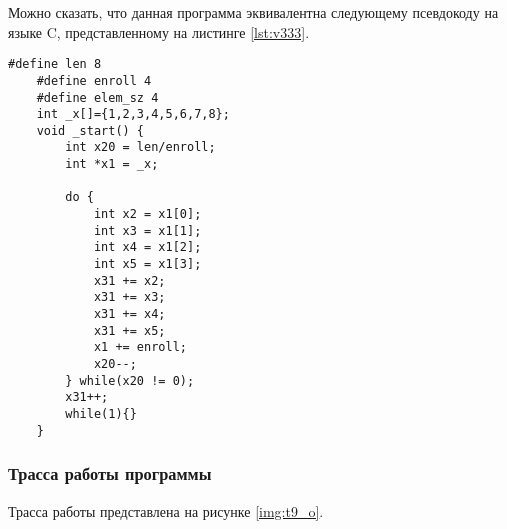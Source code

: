 Можно сказать, что данная программа эквивалентна следующему псевдокоду на языке C, представленному на листинге \ref{lst:v333}.

\begin{lstlisting}[label=lst:v333,caption=Псевдокод программы 9 варинта (оптимизированный)]
	#define len 8
	#define enroll 4
	#define elem_sz 4
	int _x[]={1,2,3,4,5,6,7,8};
	void _start() {
		int x20 = len/enroll;
		int *x1 = _x;
		
		do {
			int x2 = x1[0];
			int x3 = x1[1];
			int x4 = x1[2];
			int x5 = x1[3];
			x31 += x2;
			x31 += x3;
			x31 += x4;
			x31 += x5;
			x1 += enroll;
			x20--;
		} while(x20 != 0);
		x31++;
		while(1){}
	}
\end{lstlisting}

\subsubsection*{Трасса работы программы}
Трасса работы представлена на рисунке \ref{img:t9_o}.
\clearpage
